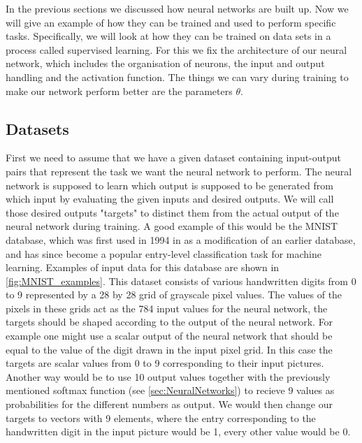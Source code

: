 In the previous sections we discussed how neural networks are built up. Now we will give an example of how they can be trained and used to perform specific tasks. Specifically, we will look at how they can be trained on data sets in a process called supervised learning. For this we fix the architecture of our neural network, which includes the organisation of neurons, the input and output handling and the activation function. The things we can vary during training to make our network perform better are the parameters $\theta$.

\subsection{Datasets}
First we need to assume that we have a given dataset containing input-output pairs that represent the task we want the neural network to perform. The neural network is supposed to learn which output is supposed to be generated from which input by evaluating the given inputs and desired outputs. We will call those desired outputs "targets" to distinct them from the actual output of the neural network during training. A good example of this would be the MNIST database, which was first used in 1994 in \cite{firstMNISTpaper}as a modification of an earlier database, and has since become a popular entry-level classification task for machine learning. Examples of input data for this database are shown in \cref{fig:MNIST_examples}. 
This dataset consists of various handwritten digits from 0 to 9 represented by a 28 by 28 grid of grayscale pixel values. The values of the pixels in these grids act as the 784 input values for the neural network, the targets should be shaped according to the output of the neural network. For example one might use a scalar output of the neural network that should be equal to the value of the digit drawn in the input pixel grid. In this case the targets are scalar values from 0 to 9 corresponding to their input pictures. Another way would be to use 10 output values together with the previously mentioned softmax function (see \cref{sec:NeuralNetworks}) to recieve 9 values as probabilities for the different numbers as output. We would then change our targets to vectors with 9 elements, where the entry corresponding to the handwritten digit in the input picture would be 1, every other value would be 0.\\

